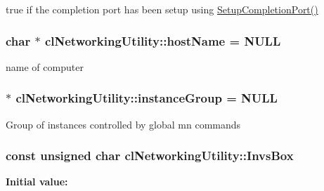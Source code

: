 \label{classcl_networking_utility_a8af49cca32d17b16891952a7ec3d7fa2}
true if the completion port has been setup using \hyperlink{classcl_networking_utility_a335aaa6c74fae074217678368e10dbda}{SetupCompletionPort()} \hypertarget{classcl_networking_utility_a9b72f62c150bd20204762c3570eb8285}{
\subsubsection[{hostName}]{\setlength{\rightskip}{0pt plus 5cm}char $\ast$ {\bf clNetworkingUtility::hostName} = NULL}}
\label{classcl_networking_utility_a9b72f62c150bd20204762c3570eb8285}
name of computer \hypertarget{classcl_networking_utility_adb843095706e79d22e1797f869f5bf8b}{
\subsubsection[{instanceGroup}]{ $\ast$ {\bf clNetworkingUtility::instanceGroup} = NULL}}
\label{classcl_networking_utility_adb843095706e79d22e1797f869f5bf8b}
Group of instances controlled by global mn commands \hypertarget{classcl_networking_utility_a73955d828bc2ad72bb1a98fff2de244c}{
\subsubsection[{InvsBox}]{\setlength{\rightskip}{0pt plus 5cm}const unsigned char {\bf clNetworkingUtility::InvsBox}}}
\label{classcl_networking_utility_a73955d828bc2ad72bb1a98fff2de244c}
{\bfseries Initial value:}
